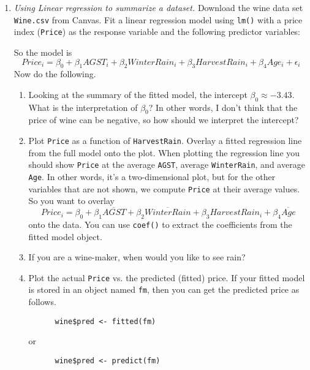 \begin{enumerate}

\item \emph{Using Linear regression to summarize a dataset.}
  Download the wine data set \texttt{Wine.csv} from Canvas. Fit a
  linear regression model using \texttt{lm()} with a price index
  (\texttt{Price}) as the response variable and the following
  predictor variables:
    So the model is
    \[ Price_i = \beta_0 + \beta_1 AGST_i + \beta_2 WinterRain_i +
      \beta_3 HarvestRain_i + \beta_4 Age_i + \epsilon_i \]
    Now do the following.
    \begin{enumerate}
    \item Looking at the summary of the fitted model, the intercept
      $\beta_0 \approx -3.43$. What is the interpretation of $\beta_0$?
      In other words, I don't think that the price of wine can be negative,
      so how should we interpret the intercept?
  \item Plot \texttt{Price} as a function of
    \texttt{HarvestRain}. Overlay a fitted regression line from the
    full model onto the plot.  When plotting the regression line you
    should show \texttt{Price} at the average \texttt{AGST}, average
    \texttt{WinterRain}, and average \texttt{Age}.
    In other words, it's a two-dimensional plot, but for the other
    variables that are not shown, we compute \texttt{Price} at their
    average values. So you want to overlay
    \[ Price_i = \beta_0 + \beta_1 \overline{AGST} +
      \beta_2 \overline{WinterRain} +
      \beta_3 HarvestRain_i +
      \beta_4 \overline{Age} \]
    onto the data. You can use \texttt{coef()} to extract the
    coefficients from the fitted model object.

  \item If you are a wine-maker, when would you like to see
    rain?

  \item Plot the actual \texttt{Price} vs. the predicted (fitted)
    price. If your fitted model is stored in an object named
    \texttt{fm}, then you can get the predicted price as follows.
    \begin{Verbatim}
      wine$pred <- fitted(fm)
    \end{Verbatim}
    or
    \begin{Verbatim}
      wine$pred <- predict(fm)
    \end{Verbatim}


\end{enumerate}
\end{enumerate}
